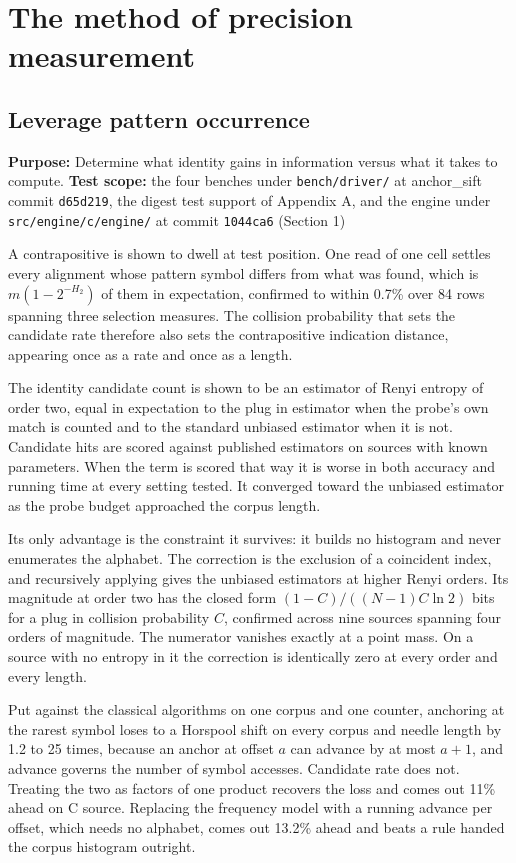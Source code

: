 \chapter{The method of precision measurement}

\section{Leverage pattern occurrence}

\textbf{Purpose:} Determine what identity gains in information versus what it takes to compute. \textbf{Test scope:} the four benches under \texttt{bench/\allowbreak{}driver/\allowbreak{}} at anchor\_sift commit \texttt{d65d219}, the digest test support of Appendix A, and the engine under \texttt{src/\allowbreak{}engine/\allowbreak{}c/\allowbreak{}engine/\allowbreak{}} at commit \texttt{1044ca6} (Section 1)

A contrapositive is shown to dwell at test position. One read of one cell settles every alignment whose pattern symbol differs from what was found, which is \(m(1-2^{-H_2})\) of them in expectation, confirmed to within 0.7\% over 84 rows spanning three selection measures. The collision probability that sets the candidate rate therefore also sets the contrapositive indication distance, appearing once as a rate and once as a length.

The identity candidate count is shown to be an estimator of Renyi entropy of order two, equal in expectation to the plug in estimator when the probe's own match is counted and to the standard unbiased estimator when it is not. Candidate hits are scored against published estimators on sources with known parameters. When the term is scored that way it is worse in both accuracy and running time at every setting tested. It converged toward the unbiased estimator as the probe budget approached the corpus length.

Its only advantage is the constraint it survives: it builds no histogram and never enumerates the alphabet. The correction is the exclusion of a coincident index, and recursively applying gives the unbiased estimators at higher Renyi orders. Its magnitude at order two has the closed form \((1-C)/((N-1)C\ln 2)\) bits for a plug in collision probability \(C\), confirmed across nine sources spanning four orders of magnitude. The numerator vanishes exactly at a point mass. On a source with no entropy in it the correction is identically zero at every order and every length.

Put against the classical algorithms on one corpus and one counter, anchoring at the rarest symbol loses to a Horspool shift on every corpus and needle length by 1.2 to 25 times, because an anchor at offset \(a\) can advance by at most \(a+1\), and advance governs the number of symbol accesses. Candidate rate does not. Treating the two as factors of one product recovers the loss and comes out 11\% ahead on C source. Replacing the frequency model with a running advance per offset, which needs no alphabet, comes out 13.2\% ahead and beats a rule handed the corpus histogram outright.


